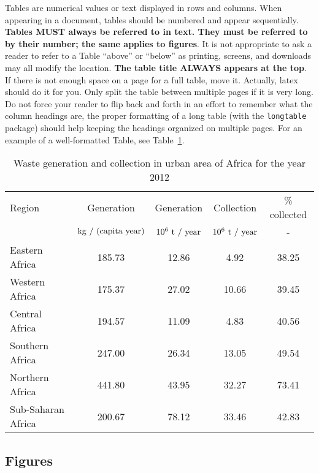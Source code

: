 Tables are numerical values or text displayed in rows and columns. When appearing in a document, tables should be numbered and appear sequentially. \textbf{Tables MUST always be referred to in text. They must be referred to by their number; the same applies to figures}. It is not appropriate to ask a reader to refer to a Table “above” or “below” as printing, screens, and downloads may all modify the location. \textbf{The table title ALWAYS appears at the top}. If there is not enough space on a page for a full table, move it. Actually, latex should do it for you. Only split the table between multiple pages if it is very long. Do not force your reader to flip back and forth in an effort to remember what the column headings are, the proper formatting of a long table (with the \texttt{longtable} package) should help keeping the headings organized on multiple pages. For an example of a well-formatted Table, see Table~\ref{tab:waste_gen}. 

\begin{table}
  \begin{center}
    \caption{\label{tab:waste_gen}Waste generation and collection in urban area of Africa for the year 2012}
    \begin{tabular}{lcccc}
      \toprule
        Region & Generation                 & Generation            & Collection            & \% collected \\
               & ${\rm kg~/~(capita~year)}$ & ${\rm 10^6~t~/~year}$ & ${\rm 10^6~t~/~year}$ & -            \\
        \midrule
        Eastern Africa     & 185.73 & 12.86 & 4.92  & 38.25 \\
        Western Africa     & 175.37 & 27.02 & 10.66 & 39.45 \\
        Central Africa     & 194.57 & 11.09 & 4.83  & 40.56 \\
        Southern Africa    & 247.00 & 26.34 & 13.05 & 49.54 \\
        Northern Africa    & 441.80 & 43.95 & 32.27 & 73.41 \\
        Sub-Saharan Africa & 200.67 & 78.12 & 33.46 & 42.83 \\
        \bottomrule
    \end{tabular}
  \end{center}
\end{table}

\subsection{\label{sec:res_fig}Figures}

